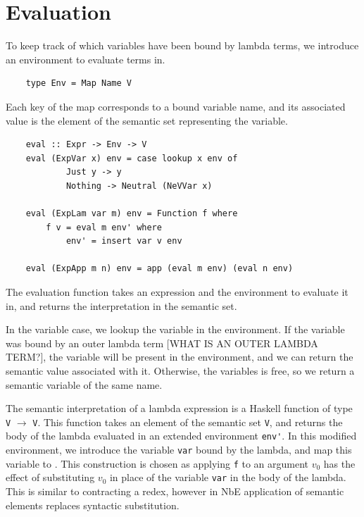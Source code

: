 
\section{Evaluation}
To keep track of which variables have been bound by lambda terms, we introduce an environment to evaluate terms in.

\begin{lstlisting}
    type Env = Map Name V
\end{lstlisting}

Each key of the map corresponds to a bound variable name, and its associated value is the element of the semantic set representing the variable. 

\begin{lstlisting}
    eval :: Expr -> Env -> V
    eval (ExpVar x) env = case lookup x env of
            Just y -> y
            Nothing -> Neutral (NeVVar x)

    eval (ExpLam var m) env = Function f where
        f v = eval m env' where
            env' = insert var v env

    eval (ExpApp m n) env = app (eval m env) (eval n env)
\end{lstlisting}

The evaluation function takes an expression and the environment to evaluate it in, and returns the interpretation in the semantic set. 

In the variable case, we lookup the variable in the environment. If the variable was bound by an outer lambda term [WHAT IS AN OUTER LAMBDA TERM?], the variable will be present in the environment, and we can return the semantic value associated with it. Otherwise, the variables is free, so we return a semantic variable of the same name.

The semantic interpretation of a lambda expression is a Haskell function of type \lstinline{V} $\rightarrow$ \lstinline{V}. This function takes an element of the semantic set \lstinline{V}, and returns the body of the lambda evaluated in an extended environment \lstinline{env'}. In this modified environment, we introduce the variable \lstinline{var} bound by the lambda, and map this variable to . This construction is chosen as applying \lstinline{f} to an argument $v_0$ has the effect of substituting $v_0$ in place of the variable \lstinline{var} in the body of the lambda. This is similar to contracting a redex, however in NbE application of semantic elements replaces syntactic substitution.

